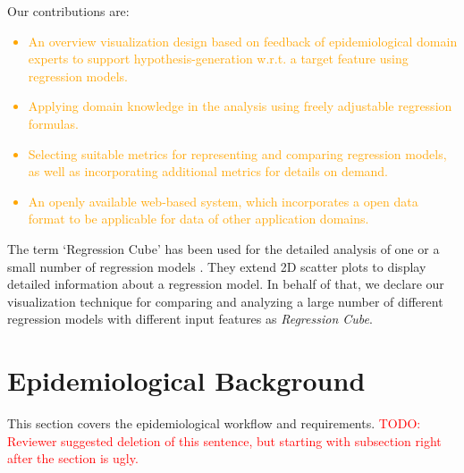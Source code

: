 \documentclass[journal]{style/vgtc} 			          %
\newcommand{\com}[1]{\textcolor{red}{#1}}
\newcommand{\design}[1]{\textcolor{orange}{#1}}
\begin{document}
Our contributions are:

\design{
\begin{itemize}
  \item An overview visualization design based on feedback of epidemiological domain experts to support hypothesis-generation w.r.t. a target feature using regression models.
  \item Applying domain knowledge in the analysis using freely adjustable regression formulas.
  \item Selecting suitable metrics for representing and comparing regression models, as well as incorporating additional metrics for details on demand.
  \item An openly available web-based system, which incorporates a open data format to be applicable for data of other application domains.
\end{itemize}
}
\noindent The term `Regression Cube' has been used for the detailed analysis of one or a small number of regression models \cite{Ahmadi, Chan}.
They extend 2D scatter plots to display detailed information about a regression model.
In behalf of that, we declare our visualization technique for comparing and analyzing a large number of different regression models with different input features as \emph{Regression Cube}.
\section{Epidemiological Background} \label{sec:Background}
This section covers the epidemiological workflow and requirements.
\com{TODO: Reviewer suggested deletion of this sentence, but starting with subsection right after the section is ugly.}
\end{document}
